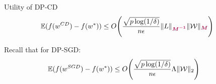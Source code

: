 \documentclass[17pt,aspectratio=169]{beamer}
\begin{document}
\begin{frame}{Utility of DP-CD}
  \vspace{-1em}
  \begin{align*}
    \mathbb E ( f(w^{CD}) - f(w^*) )
    & \le
      O \Bigg(
      \frac{ \sqrt{p \log(1/\delta) }  }{ n \epsilon } \| L \|_{\boldsymbol{\textcolor{purple}{M^{-1}}}} \|  \mathcal W  \|_{\boldsymbol{\textcolor{purple}{M}}}
      \Bigg)
  \end{align*}

  \vspace{1em}

  Recall that for DP-SGD:
  \begin{align*}
    \mathbb E ( f(w^{SGD}) - f(w^*) )
    & \le
      O\Bigg(
      \frac{\sqrt{p\log(1/\delta)}}{n \epsilon} \Lambda \| \mathcal W \|_2
      \Bigg)
    &&
  \end{align*}
\end{frame}
\end{document}
